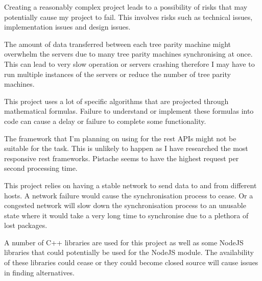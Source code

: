 

Creating a reasonably complex project leads to a possibility of risks that may potentially cause my project to fail. This involves risks such as technical issues, implementation issues and design issues. 

The amount of data transferred between each tree parity machine might overwhelm the servers due to many tree parity machines synchronising at once. This can lead to very slow operation or servers crashing therefore I may have to run multiple instances of the servers or reduce the number of tree parity machines.

This project uses a lot of specific algorithms that are projected through mathematical formulas. Failure to understand or implement these formulas into code can cause a delay or failure to complete some functionality.

The framework that I'm planning on using for the rest APIs might not be suitable for the task. This is unlikely to happen as I have researched the most responsive rest frameworks. Pistache seems to have the highest request per second processing time.

This project relies on having a stable network to send data to and from different hosts. A network failure would cause the synchronisation process to cease. Or a congested network will slow down the synchronisation process to an unusable state where it would take a very long time to synchronise due to a plethora of lost packages.

A number of C++ libraries are used for this project as well as some NodeJS libraries that could potentially be used for the NodeJS module. The availability of these libraries could cease or they could become closed source will cause issues in finding alternatives. 

